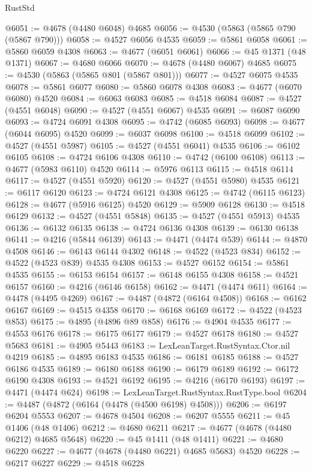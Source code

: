 \begin{lexlean}{RustStd}
\begin{coremodule}
@6051 := @4678 (@4480 @6048) @4685
@6056 := @4530 (@5863 (@5865 @790 (@5867 @790)))
@6058 := @4527 @6056 @4535
@6059 := @5861 @6058
@6061 := @5860 @6059 @4308
@6063 := @4677 (@6051 @6061)
@6066 := @45 @1371 (@48 @1371)
@6067 := @4680 @6066
@6070 := @4678 (@4480 @6067) @4685
@6075 := @4530 (@5863 (@5865 @801 (@5867 @801)))
@6077 := @4527 @6075 @4535
@6078 := @5861 @6077
@6080 := @5860 @6078 @4308
@6083 := @4677 (@6070 @6080) @4520
@6084 := @6063 @6083
@6085 := @4518 @6084
@6087 := @4527 (@4551 @6048)
@6090 := @4527 (@4551 @6067) @4535
@6091 := @6087 @6090
@6093 := @4724 @6091 @4308
@6095 := @4742 (@6085 @6093)
@6098 := @4677 (@6044 @6095) @4520
@6099 := @6037 @6098
@6100 := @4518 @6099
@6102 := @4527 (@4551 @5987)
@6105 := @4527 (@4551 @6041) @4535
@6106 := @6102 @6105
@6108 := @4724 @6106 @4308
@6110 := @4742 (@6100 @6108)
@6113 := @4677 (@5983 @6110) @4520
@6114 := @5976 @6113
@6115 := @4518 @6114
@6117 := @4527 (@4551 @5920)
@6120 := @4527 (@4551 @5980) @4535
@6121 := @6117 @6120
@6123 := @4724 @6121 @4308
@6125 := @4742 (@6115 @6123)
@6128 := @4677 (@5916 @6125) @4520
@6129 := @5909 @6128
@6130 := @4518 @6129
@6132 := @4527 (@4551 @5848)
@6135 := @4527 (@4551 @5913) @4535
@6136 := @6132 @6135
@6138 := @4724 @6136 @4308
@6139 := @6130 @6138
@6141 := @4216 (@5844 @6139)
@6143 := @4471 (@4474 @539)
@6144 := @4870 @4508
@6146 := @6143 @6144 @4302
@6148 := @4522 (@4523 @834)
@6152 := @4522 (@4523 @839) @4535 @4308
@6153 := @4527 @6152
@6154 := @5861 @4535
@6155 := @6153 @6154
@6157 := @6148 @6155 @4308
@6158 := @4521 @6157
@6160 := @4216 (@6146 @6158)
@6162 := @4471 (@4474 @611)
@6164 := @4478 (@4495 @4269)
@6167 := @4487 (@4872 (@6164 @4508))
@6168 := @6162 @6167
@6169 := @4515 @4358
@6170 := @6168 @6169
@6172 := @4522 (@4523 @853)
@6175 := @4895 (@4896 @89 @858)
@6176 := @4904 @4535
@6177 := @4553 @6176
@6178 := @6175 @6177
@6179 := @4527 @6178
@6180 := @4527 @5683
@6181 := @4905 @5443
@6183 := LexLeanTarget.RustSyntax.Ctor.nil @4219
@6185 := @4895 @6183 @4535
@6186 := @6181 @6185
@6188 := @4527 @6186 @4535
@6189 := @6180 @6188
@6190 := @6179 @6189
@6192 := @6172 @6190 @4308
@6193 := @4521 @6192
@6195 := @4216 (@6170 @6193)
@6197 := @4471 (@4474 @624)
@6198 := LexLeanTarget.RustSyntax.RustType.bool
@6204 := @4487 (@4872 (@6164 (@4478 (@4500 @6198) @4508)))
@6206 := @6197 @6204 @5553
@6207 := @4678 @4504
@6208 := @6207 @5555
@6211 := @45 @1406 (@48 @1406)
@6212 := @4680 @6211
@6217 := @4677 (@4678 (@4480 @6212) @4685 @5648)
@6220 := @45 @1411 (@48 @1411)
@6221 := @4680 @6220
@6227 := @4677 (@4678 (@4480 @6221) @4685 @5683) @4520
@6228 := @6217 @6227
@6229 := @4518 @6228

\end{coremodule}
\end{lexlean}
